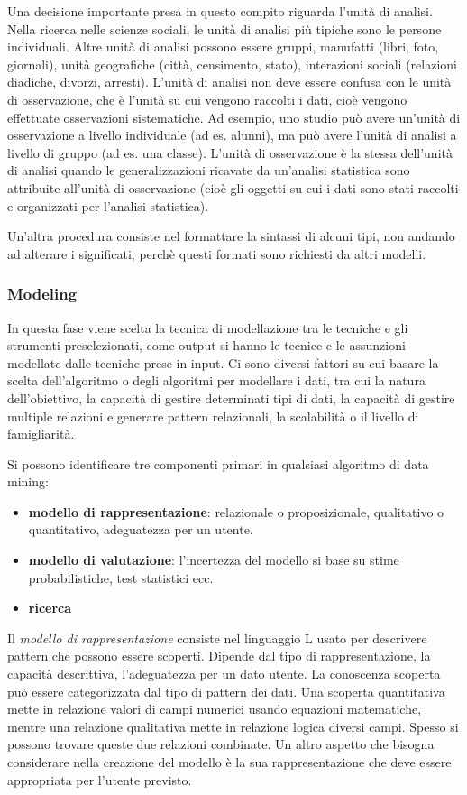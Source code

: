\documentclass[a4paper]{extarticle}
\begin{document}
Una decisione importante presa in questo compito riguarda l'unità di analisi. Nella ricerca nelle scienze sociali, le unità di analisi più tipiche sono le persone individuali. Altre unità di analisi possono essere gruppi, manufatti (libri, foto, giornali), unità geografiche (città, censimento, stato), interazioni sociali (relazioni diadiche, divorzi, arresti). L'unità di analisi non deve essere confusa con le unità di osservazione, che è l'unità su cui vengono raccolti i dati, cioè vengono effettuate osservazioni sistematiche. Ad esempio, uno studio può avere un'unità di osservazione a livello individuale (ad es. alunni), ma può avere l'unità di analisi a livello di gruppo (ad es. una classe). L'unità di osservazione è la stessa dell'unità di analisi quando le generalizzazioni ricavate da un'analisi statistica sono attribuite all'unità di osservazione (cioè gli oggetti su cui i dati sono stati raccolti e organizzati per l'analisi statistica).

Un'altra procedura consiste nel formattare la sintassi di alcuni tipi, non andando ad alterare i significati, perchè questi formati sono richiesti da altri modelli.

\subsubsection{Modeling}

In questa fase viene scelta la tecnica di modellazione tra le tecniche e gli strumenti preselezionati, come output si hanno le tecnice e le assunzioni modellate dalle tecniche prese in input. Ci sono diversi fattori su cui basare la scelta dell'algoritmo o degli algoritmi per modellare i dati, tra cui la natura dell'obiettivo, la capacità di gestire determinati tipi di dati, la capacità di gestire multiple relazioni e generare pattern relazionali, la scalabilità o il livello di famigliarità. 

Si possono identificare tre componenti primari in qualsiasi algoritmo di data mining:
\begin{itemize}
\item \textbf{modello di rappresentazione}: relazionale o proposizionale, qualitativo o quantitativo, adeguatezza per un utente.
\item \textbf{modello di valutazione}: l'incertezza del modello si base su stime probabilistiche, test statistici ecc.
\item \textbf{ricerca}
\end{itemize}

Il \textit{modello di rappresentazione} consiste nel linguaggio L usato per descrivere pattern che possono essere scoperti. Dipende dal tipo di rappresentazione, la capacità descrittiva, l'adeguatezza per un dato utente. La conoscenza scoperta può essere categorizzata dal tipo di pattern dei dati. Una scoperta quantitativa mette in relazione valori di campi numerici usando equazioni matematiche, mentre una relazione qualitativa mette in relazione logica diversi campi. Spesso si possono trovare queste due relazioni combinate. Un altro aspetto che bisogna considerare nella creazione del modello è la sua rappresentazione che deve essere appropriata per l'utente previsto. 
\end{document}
